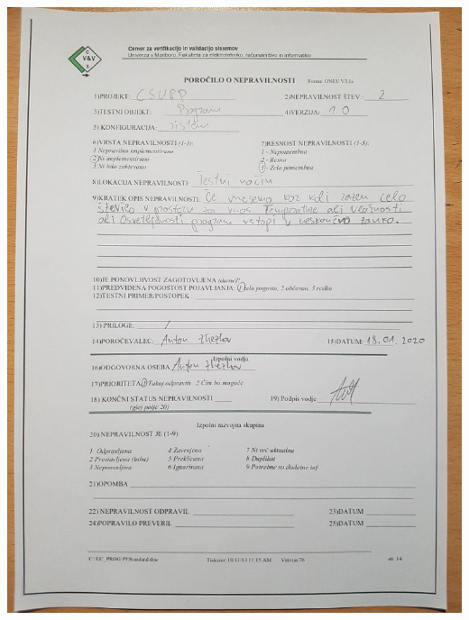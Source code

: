 \documentclass[a4paper,12pt]{article}
\begin{document}
{	\includegraphics[width=15cm]{porocila/02.jpg}

\newpage

	\hspace{2cm}

	\vspace{2cm}
	
}
\end{document}
